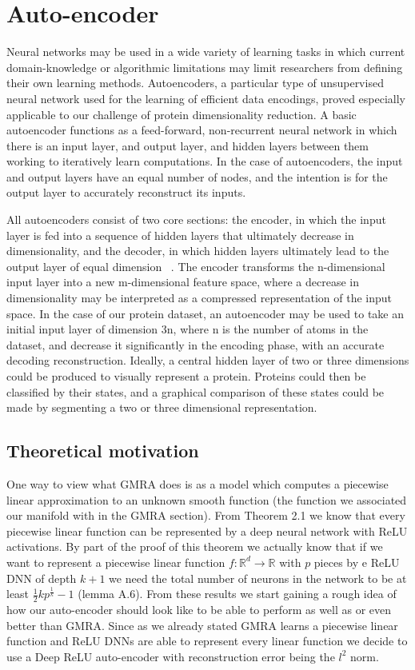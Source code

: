 \documentclass{article}
\begin{document}
	\section{Auto-encoder}
	Neural networks may be used in a wide variety of learning tasks in which current domain-knowledge or algorithmic limitations may limit researchers from defining their own learning methods. Autoencoders, a particular type of unsupervised neural network used for the learning of efficient data encodings, proved especially applicable to our challenge of protein dimensionality reduction. A basic autoencoder functions as a feed-forward, non-recurrent neural network in which there is an input layer, and output layer, and hidden layers between them working to iteratively learn computations. In the case of autoencoders, the input and output layers have an equal number of nodes, and the intention is for the output layer to accurately reconstruct its inputs.
	
	All autoencoders consist of two core sections: the encoder, in which the input layer is fed into a sequence of hidden layers that ultimately decrease in dimensionality, and the decoder, in which hidden layers ultimately lead to the output layer of equal dimension ~\cite{autoencoderintro}. The encoder transforms the n-dimensional input layer into a new m-dimensional feature space, where a decrease in dimensionality may be interpreted as a compressed representation of the input space. In the case of our protein dataset, an autoencoder may be used to take an initial input layer of dimension 3n, where n is the number of atoms in the dataset, and decrease it significantly in the encoding phase, with an accurate decoding reconstruction. Ideally, a central hidden layer of two or three dimensions could be produced to visually represent a protein. Proteins could then be classified by their states, and a graphical comparison of these states could be made by segmenting a two or three dimensional representation.
	
	\subsection{Theoretical motivation}
	One way to view what GMRA does is as a model which computes a piecewise linear approximation to an unknown smooth function (the function we associated our manifold with in the GMRA section). From \cite{arora2016understanding} Theorem 2.1 we know that every piecewise linear function can be represented by a deep neural network with ReLU activations. By part of the proof of this theorem we actually know that if we want to represent a piecewise linear function $f:\mathbb{R}^d \rightarrow \mathbb{R}$ with $p$ pieces by e ReLU DNN of depth $k+1$ we need the total number of neurons in the network to be at least $\frac{1}{2}kp^{\frac{1}{k}}-1$ (lemma A.6). From these results we start gaining a rough idea of how our auto-encoder should look like to be able to perform as well as or even better than GMRA. Since as we already stated GMRA learns a piecewise linear function and ReLU DNNs are able to represent every linear function we decide to use a Deep ReLU auto-encoder with reconstruction error being the $l^2$ norm.
	
\end{document}
